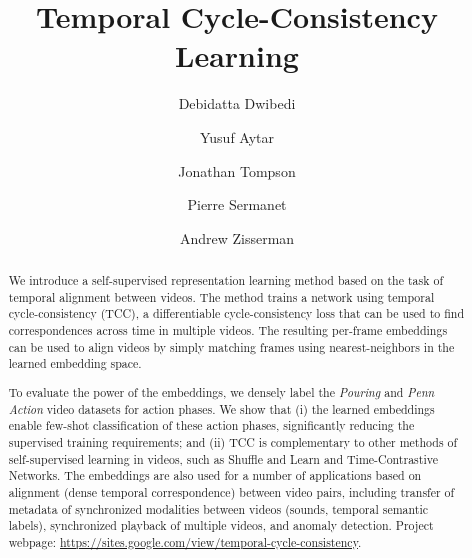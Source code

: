 \documentclass[10pt,twocolumn,letterpaper]{article}
\newcommand{\methodlong}{temporal cycle-consistency }
\begin{document}
\title{Temporal Cycle-Consistency Learning \vspace{-1em}}

\author[ 1]{Debidatta Dwibedi}
\author[ 2]{Yusuf Aytar}
\author[ 1]{Jonathan Tompson}
\author[ 1]{Pierre Sermanet}
\author[ 2]{Andrew Zisserman}



\begin{abstract}

We introduce a self-supervised representation learning method based on the task of
temporal alignment between videos. The method trains a network using \methodlong (TCC), a differentiable cycle-consistency loss that can be used to find correspondences across time in multiple videos. The resulting per-frame embeddings can be used to align videos by simply matching frames using nearest-neighbors in the learned embedding space.

To evaluate the power of the embeddings, we densely label the \textit{Pouring} and \textit{Penn Action} video datasets for action phases. We show that (i) the learned embeddings enable few-shot classification of these action phases, significantly reducing the supervised training requirements; and (ii) TCC is complementary to other methods of self-supervised learning in videos, such as Shuffle and Learn and Time-Contrastive Networks. The embeddings are also used for a number of applications based on alignment (dense temporal correspondence) between video pairs, including transfer of metadata of synchronized modalities between videos (sounds, temporal semantic labels), synchronized playback of multiple videos, and anomaly detection. Project webpage: \url{https://sites.google.com/view/temporal-cycle-consistency}.
\end{abstract}
\end{document}
